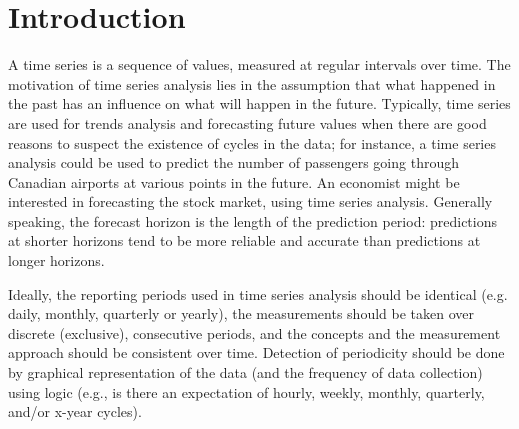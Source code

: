 \section{Introduction}

A time series is a sequence of values, measured at regular intervals over time. The motivation of time series analysis lies in the assumption that what happened in the past has an influence on what will happen in the future. Typically, time series are used for trends analysis and forecasting future values when there are good reasons to suspect the existence of cycles in the data; for instance, a time series analysis could be used to predict the number of passengers going through Canadian airports at various points in the future. An economist might be interested in forecasting the stock market, using time series analysis. Generally speaking, the forecast horizon is the length of the prediction period: predictions at shorter horizons tend to be more reliable and accurate than predictions at longer horizons.

Ideally, the reporting periods used in time series analysis should be identical (e.g. daily, monthly, quarterly or yearly), the measurements should be taken over discrete (exclusive), consecutive periods, and the concepts and the measurement approach should be consistent over time. Detection of periodicity should be done by graphical representation of the data (and the frequency of data collection) using logic (e.g., is there an expectation of hourly, weekly, monthly, quarterly, and/or x-year cycles).

